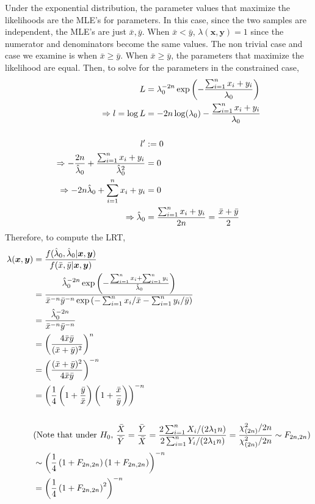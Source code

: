 \documentclass[11pt]{article}
\newcommand{\p}[1]{\left(#1\right)}
\begin{document}
\noindent
Under the exponential distribution, the parameter values that maximize the likelihoods are the MLE's for 
parameters. In this case, since the two samples are independent, the MLE's are just $\bar x, \bar y$. When
$\bar x < \bar y$, $\lambda(\bm x, \bm y) = 1$ since the numerator and denominators become the same values. 
The non trivial case and case we examine is when $\bar x \ge \bar y$. When $\bar x \ge \bar y$, the parameters
that maximize the likelihood are equal. Then, to solve for the parameters in the constrained case, 
\[
\begin{aligned}
  L&=\lambda_0^{-2n}\exp\p{-\frac{\suml x_i + y_i}{\lambda_0}}\\
  \Rightarrow l=\log L &= -2n\log(\lambda_0) - \frac{\suml x_i + y_i}{\lambda_0}\\
  \\
  l' &:=0 \\
  \Rightarrow -\frac{2n}{\hat\lambda_0} + \frac{\suml x_i + y_i}{\hat\lambda_0^2} &= 0 \\
  \Rightarrow -2n\hat\lambda_0 + \suml x_i + y_i &= 0 \\
  \Rightarrow \hat\lambda_0 &= \frac{\suml x_i + y_i}{2n} =  \frac{\bar x + \bar y}{2}
\end{aligned}
\]
Therefore, to compute the LRT, 
\def\xbar{\bar x}
\def\ybar{\bar y}
\[
\begin{aligned}
  \lambda(\bm x, \bm y) &= \frac{f(\hat\lambda_0, \hat\lambda_0 | \bm x, \bm y)}{f(\bar x, \bar y | \bm x, \bm y)}\\
                        &= \frac{\hat\lambda_0^{-2n}\exp\p{-\frac{\suml x_i + \suml y_i}{\hat\lambda_0}}}{\bar x^{-n} \bar y^{-n}\exp\p{-\suml x_i/\bar x - \suml y_i /\bar y}}\\
                        &= \frac{\hat\lambda_0^{-2n}}{\bar x^{-n} \bar y^{-n}}\\
                        &= \p{\frac{4\bar x \bar y}{(\bar x + \bar y)^2}}^n \\
                        &= \p{\frac{(\bar x + \bar y)^2}{4\bar x \bar y}}^{-n} \\
                        &= \p{\frac{1}{4}\p{1+\frac{\ybar}{\xbar}}\p{1+\frac{\xbar}{\ybar}}}^{-n}\\
  \\
  &(\text{Note that under $H_0$, $\frac{\bar X}{\bar Y} = \frac{\bar Y}{\bar X} = \frac{2\suml X_i/(2\lambda_1n)}{2\suml Y_i/(2\lambda_1n)} = \frac{\chi^2_{(2n)}/2n}{\chi^2_{(2n)}/2n} \sim F_{2n,2n}$})\\
  &\sim \p{\frac{1}{4}\p{1+F_{2n,2n}}\p{1+F_{2n,2n}}}^{-n}\\
  &= \p{\frac{1}{4}\p{1+F_{2n,2n}}^2}^{-n}\\
\end{aligned}
\]
\end{document}
